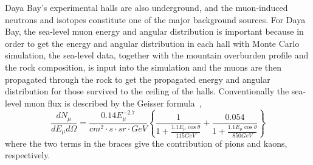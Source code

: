 Daya Bay's experimental halls are also underground, and the muon-induced neutrons and isotopes constitute one of the major background sources. For Daya Bay, the sea-level muon energy and angular distribution is important because in order to get the energy and angular distribution in each hall with Monte Carlo simulation, the sea-level data, together with the mountain overburden profile and the rock composition, is input into the simulation and the muons are then propagated through the rock to get the propagated energy and angular distribution for those survived to the ceiling of the halls. Conventionally the sea-level muon flux is described by the Geisser formula~\cite{Beringer2012},
\begin{equation}
\frac{dN_\mu}{dE_\mu d\Omega}=\frac{0.14E_\mu^{-2.7}}{cm^2\cdot s \cdot sr \cdot GeV}\left\lbrace \frac{1}{1+\frac{1.1E_\mu\cos\theta}{115GeV}}+\frac{0.054}{1+\frac{1.1E_\mu\cos\theta}{850GeV}} \right\rbrace
\end{equation}
where the two terms in the braces give the contribution of pions and kaons, respectively.